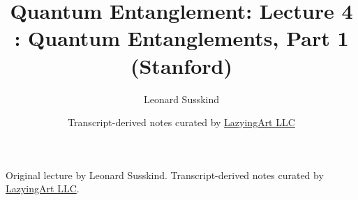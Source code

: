 \documentclass[11pt,oneside]{book}
\begin{document}
\frontmatter
\title{Quantum Entanglement: Lecture 4 : Quantum Entanglements, Part 1 (Stanford)}
\author{Leonard Susskind}
\date{Transcript-derived notes curated by \href{https://lazying.art}{LazyingArt LLC}}
\maketitle
\begin{center}
\small Original lecture by Leonard Susskind. Transcript-derived notes curated by \href{https://lazying.art}{LazyingArt LLC}.
\end{center}
\clearpage
\mainmatter

\end{document}
